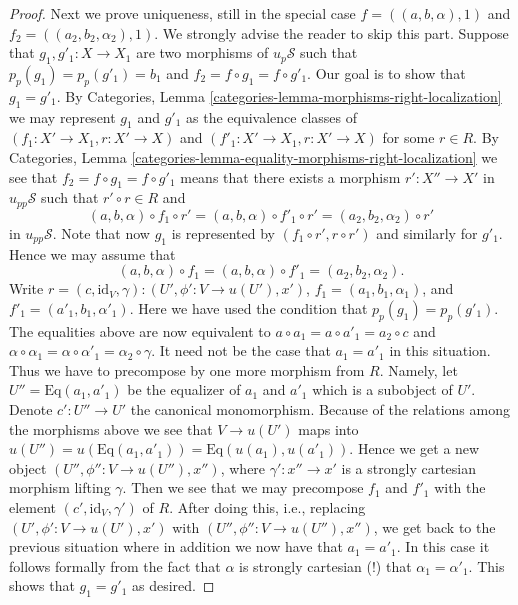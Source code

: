 \begin{proof}
\medskip\noindent
Next we prove uniqueness, still in the special case
$f = ((a, b, \alpha), 1)$ and $f_2 = ((a_2, b_2, \alpha_2), 1)$.
We strongly advise the reader to skip this part.
Suppose that $g_1, g'_1 : X \to X_1$ are two morphisms of
$u_p\mathcal{S}$ such that $p_p(g_1) = p_p(g'_1) = b_1$ and
$f_2 = f \circ g_1 = f \circ g'_1$. Our goal is to show that
$g_1 = g'_1$. By
Categories, Lemma \ref{categories-lemma-morphisms-right-localization}
we may represent $g_1$ and $g'_1$ as the equivalence classes of
$(f_1 : X' \to X_1, r : X' \to X)$ and
$(f'_1 : X' \to X_1, r : X' \to X)$ for some $r \in R$. By
Categories, Lemma \ref{categories-lemma-equality-morphisms-right-localization}
we see that $f_2 = f \circ g_1 = f \circ g'_1$ means that there
exists a morphism $r' : X'' \to X'$ in $u_{pp}\mathcal{S}$ such that
$r' \circ r \in R$ and
$$
(a, b, \alpha) \circ f_1 \circ r' = 
(a, b, \alpha) \circ f'_1 \circ r' = 
(a_2, b_2, \alpha_2) \circ r'
$$
in $u_{pp}\mathcal{S}$. Note that
now $g_1$ is represented by $(f_1 \circ r', r \circ r')$ and
similarly for $g'_1$. Hence we may assume that
$$
(a, b, \alpha) \circ f_1 =
(a, b, \alpha) \circ f'_1 =
(a_2, b_2, \alpha_2).
$$
Write $r = (c, \text{id}_V, \gamma) : (U', \phi' : V \to u(U'), x')$,
$f_1 = (a_1, b_1, \alpha_1)$, and $f'_1 = (a'_1, b_1, \alpha'_1)$.
Here we have used the condition that $p_p(g_1) = p_p(g'_1)$.
The equalities above are now equivalent to
$a \circ a_1 = a \circ a'_1 = a_2 \circ c$ and
$\alpha \circ \alpha_1 = \alpha \circ \alpha'_1 = \alpha_2 \circ \gamma$.
It need not be the case that $a_1 = a'_1$ in this situation.
Thus we have to precompose by one more morphism from $R$.
Namely, let $U'' = \text{Eq}(a_1, a'_1)$ be the equalizer of
$a_1$ and $a'_1$ which is a subobject of $U'$. Denote
$c' : U'' \to U'$ the canonical monomorphism.
Because of the relations among the morphisms
above we see that $V \to u(U')$ maps into
$u(U'') = u(\text{Eq}(a_1, a'_1)) = \text{Eq}(u(a_1), u(a'_1))$.
Hence we get a new object $(U'', \phi'' : V \to u(U''), x'')$, where
$\gamma' : x'' \to x'$ is a strongly cartesian morphism lifting $\gamma$.
Then we see that we may precompose $f_1$ and $f'_1$ with the element
$(c', \text{id}_V, \gamma')$ of $R$. After doing this, i.e., replacing
$(U', \phi' : V \to u(U'), x')$ with
$(U'', \phi'' : V \to u(U''), x'')$, we get back to the previous
situation where in addition we now have that $a_1 = a'_1$.
In this case it follows formally from the fact that $\alpha$
is strongly cartesian (!) that $\alpha_1 = \alpha'_1$.
This shows that $g_1 = g'_1$ as desired.


\end{proof}
